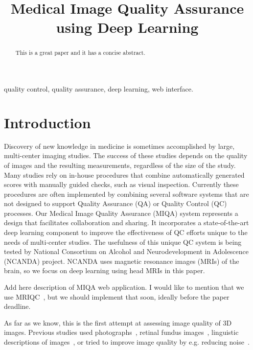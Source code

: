 \documentclass{midl} %
\title[Medical Image Quality Assurance using Deep Learning]{Medical Image Quality Assurance using Deep Learning}
\begin{document}
\maketitle

\begin{abstract}
This is a great paper and it has a concise abstract.
\end{abstract}

\begin{keywords}
quality control, quality assurance, deep learning, web interface.
\end{keywords}

\section{Introduction}

Discovery of new knowledge in medicine is sometimes accomplished by large, multi-center imaging studies. The success of these studies depends on the quality of images and the resulting measurements, regardless of the size of the study. Many studies rely on in-house procedures that combine automatically generated scores with manually guided checks, such as visual inspection. Currently these procedures are often implemented by combining several software systems that are not designed to support Quality Assurance (QA) or Quality Control (QC) processes. Our Medical Image Quality Assurance (MIQA) system represents a design that facilitates collaboration and sharing. It incorporates a state-of-the-art deep learning component to improve the effectiveness of QC efforts unique to the needs of multi-center studies. The usefulness of this unique QC system is being tested by National Consortium on Alcohol and Neurodevelopment in Adolescence (NCANDA) project. NCANDA uses magnetic resonance images (MRIs) of the brain, so we focus on deep learning using head MRIs in this paper.

Add here description of MIQA web application. I would like to mention that we use MRIQC~\cite{esteban2017mriqc}, but we should implement that soon, ideally before the paper deadline.

As far as we know, this is the first attempt at assessing image quality of 3D images. Previous studies used photographs~\cite{bosse2017deep,bianco2018use,hosu2020koniq}, retinal fundus images~\cite{yu2017image}, linguistic descriptions of images~\cite{hou2014blind}, or tried to improve image quality by e.g. reducing noise~\cite{higaki2019improvement}.
\end{document}
